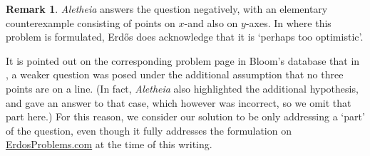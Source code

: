 \documentclass{article}
\theoremstyle{plain}
\theoremstyle{definition}
\newtheorem{remark}{Remark}[section]
\newcommand{\Aletheia}{\emph{Aletheia}}
\begin{document}
\begin{remark}
{\Aletheia} answers the question negatively, with an elementary counterexample consisting of points on $x$-and also on $y$-axes. In \cite[p. 530]{Er97e} where this problem is formulated, Erd\H{o}s does acknowledge that it is `perhaps too optimistic'.

It is pointed out on the corresponding problem page in Bloom's database that in \cite{Er87b,ErPa90}, a weaker question was posed under the additional assumption that no three points are on a line. (In fact, {\Aletheia} also highlighted the additional hypothesis, and gave an answer to that case, which however was incorrect, so we omit that part here.) For this reason, we consider our solution to be only addressing a `part' of the question, even though it fully addresses the formulation on \href{https://www.erdosproblems.com/}{\ttfamily ErdosProblems.com} at the time of this writing.
\end{remark}
\end{document}
